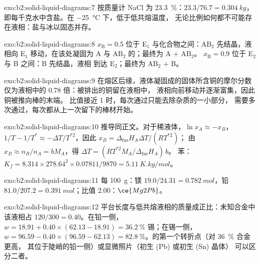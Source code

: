 \begin{solution}{exo:b2:solid-liquid-diagrams:7}
按质量计 NaCl 为 23.3~\%：$23.3/76.7 = \qty{0.304}{kg}$，
即每千克水中含盐。在 \qty{-25}{\degreeCelsius} 下，低于低共熔温度，
无论比例如何都不可能存在液相：盐与冰以固态并存。
\end{solution}

\begin{solution}{exo:b2:solid-liquid-diagrams:8}
$x_{\mathrm B} = 0.5$ 位于 E$_1$ 与化合物之间：$\mathrm{AB_2}$
先结晶，液相向 E$_1$ 移动，在该处凝固为
A 与 $\mathrm{AB_2}$ 的；最终为 A + $\mathrm{AB_2}$。
$x_{\mathrm B} = 0.9$ 位于 E$_2$ 与 B 之间：B 先结晶，液相
到达 E$_2$；最终为 $\mathrm{AB_2}$ + B。
\end{solution}

\begin{solution}{exo:b2:solid-liquid-diagrams:9}
在熔区后缘，液体凝固成的固体所含铜的摩尔分数
仅为液相中的 0.78 倍：被排出的铜留在液相中，
液相向前移动并逐渐富集，因此铜被推向棒的末端。
比值接近 1 时，每次通过只能去除杂质的一小部分，
需要多次通过，每次都从上一次留下的棒材开始。
\end{solution}

\begin{solution}{exo:b2:solid-liquid-diagrams:10}
推导同正文。对于稀液体，$\ln x_A \approx -x_B$，$1/T -
1/T^* \approx -\Delta T/T^{*2}$，因此 $x_B = \Delta_{\text{fus}}H_A\Delta T/(RT^{*2})$；
由 $x_B \approx n_B/n_A = bM_A$，得 $\Delta T = (RT^{*2}M_A/\Delta_{\text{fus}}H_A)\,b$。
苯：$K_f = 8.314 \times 278.64^2 \times 0.07811/9870 = \qty{5.11}{K.kg/mol}$。
\end{solution}

\begin{solution}{exo:b2:solid-liquid-diagrams:11}
每 \qty{100}{g}：镁 $19.0/24.31 = \qty{0.782}{mol}$，铅 $81.0/207.2 =
\qty{0.391}{mol}$；比值 $2.00$：$\ce{Mg2Pb}$。
\end{solution}

\begin{solution}{exo:b2:solid-liquid-diagrams:12}
平台长度与低共熔液相的质量成正比：未知合金中该液相占
$120/300 = 0.40$。在铅一侧，$w = 18.91 + 0.40 \times (62.13 -
18.91) = 36.2~\%$ 锡；在锡一侧，$w = 96.59 - 0.40 \times (96.59 - 62.13) =
82.8~\%$。的第一个转折点（对 36~\% 合金更高，
其位于陡峭的铅一侧）或显微照片（初生 (Pb) 或初生 (Sn) 晶体）
可以区分二者。
\end{solution}

